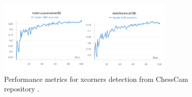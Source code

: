\begin{figure}[H]
\centering
\includegraphics[width=0.75\textwidth]{figures/results/machine-learning/xcorners-metrics.png}
\caption[Performance xcorners detection (ChessCam)]{Performance metrics for xcorners detection from ChessCam repository \cite{wandb:xcorner-detection}.}
\label{fig:chesscam-xcorners-metrics}
\end{figure}




